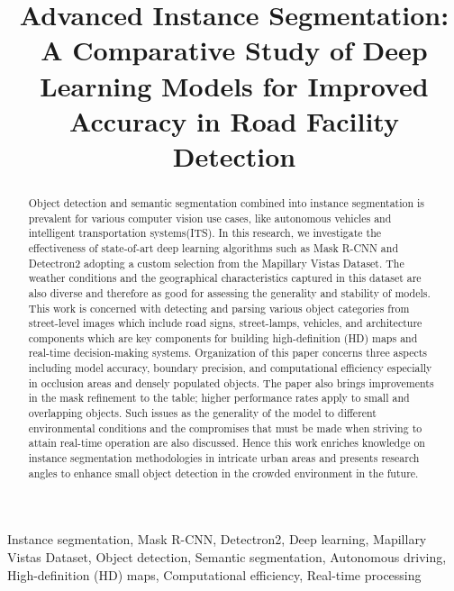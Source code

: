\documentclass[conference]{IEEEtran}
\begin{document}
\title{Advanced Instance Segmentation: A Comparative Study of Deep Learning Models for Improved Accuracy in Road Facility Detection
\\
}

\author{
    \IEEEauthorblockA{\textcolor{red}{
        STME, SVKM's Narsee Monjee Institute of Management Studies (NMIMS) Deemed-to-be-University,}}
    \IEEEauthorblockA{\textcolor{red}{Navi Mumbai, Maharashtra, India}}
}
\maketitle




\begin{abstract}
Object detection and semantic segmentation combined into instance segmentation is prevalent for various computer vision use cases, like autonomous vehicles and intelligent transportation systems(ITS). In this research, we investigate the effectiveness of state-of-art deep learning algorithms such as Mask R-CNN and Detectron2 adopting a custom selection from the Mapillary Vistas Dataset. The weather conditions and the geographical characteristics captured in this dataset are also diverse and therefore as good for assessing the generality and stability of models. This work is concerned with detecting and parsing various object categories from street-level images which include road signs, street-lamps, vehicles, and architecture components which are key components for building high-definition (HD) maps and real-time decision-making systems. Organization of this paper concerns three aspects including model accuracy, boundary precision, and computational efficiency especially in occlusion areas and densely populated objects. The paper also brings improvements in the mask refinement to the table; higher performance rates apply to small and overlapping objects. Such issues as the generality of the model to different environmental conditions and the compromises that must be made when striving to attain real-time operation are also discussed. Hence this work enriches knowledge on instance segmentation methodologies in intricate urban areas and presents research angles to enhance small object detection in the crowded environment in the future.
\end{abstract}
\begin{IEEEkeywords}
Instance segmentation, Mask R-CNN, Detectron2, Deep learning, Mapillary Vistas Dataset, Object detection, Semantic segmentation, Autonomous driving, High-definition (HD) maps, Computational efficiency, Real-time processing
\end{IEEEkeywords}
\end{document}
